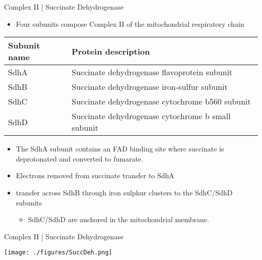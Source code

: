 \documentclass[presentation, smaller]{beamer}
\begin{document}
\begin{frame}[label={sec:orge4b411c}]{Complex II | Succinate Dehydrogenase}
\begin{itemize}
\item Four subunits compose Complex II of the mitochondrial respiratory chain
\end{itemize}

\begin{center}
\begin{tabular}{ll}
Subunit name & Protein description\\
\hline
SdhA & Succinate dehydrogenase flavoprotein subunit\\
SdhB & Succinate dehydrogenase iron-sulfur subunit\\
SdhC & Succinate dehydrogenase cytochrome b560 subunit\\
SdhD & Succinate dehydrogenase cytochrome b small subunit\\
\end{tabular}
\end{center}

\begin{itemize}
\item The SdhA subunit contains an FAD binding site where succinate
is deprotonated and converted to fumarate.
\end{itemize}


\begin{itemize}
\item Electrons removed from succinate transfer to SdhA
\item transfer across SdhB through iron sulphur clusters to the SdhC/SdhD subunits
\begin{itemize}
\item SdhC/SdhD are anchored in the mitochondrial membrane.
\end{itemize}
\end{itemize}
\end{frame}

\begin{frame}[label={sec:orgaf21b70}]{Complex II | Succinate Dehydrogenase}
\begin{center}
\texttt{[image: ./figures/SuccDeh.png]}
\end{center}
\end{frame}
\end{document}
